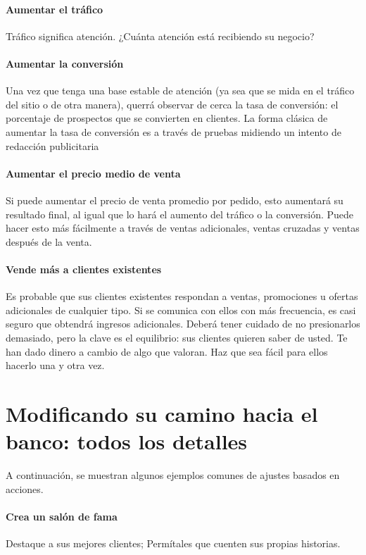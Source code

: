 \documentclass[10pt]{book}
\begin{document}
	    \paragraph{Aumentar el tráfico}
		Tráfico significa atención. ¿Cuánta atención está recibiendo su negocio?

	    \paragraph{Aumentar la conversión}
		Una vez que tenga una base estable de atención (ya sea que se mida en el tráfico del sitio o de otra manera), querrá observar de cerca la tasa de conversión: el porcentaje de prospectos que se convierten en clientes. La forma clásica de aumentar la tasa de conversión es a través de pruebas midiendo un intento de redacción publicitaria 

	    \paragraph{Aumentar el precio medio de venta}
		Si puede aumentar el precio de venta promedio por pedido, esto aumentará su resultado final, al igual que lo hará el aumento del tráfico o la conversión. Puede hacer esto más fácilmente a través de ventas adicionales, ventas cruzadas y ventas después de la venta. 

	    \paragraph{Vende más a clientes existentes}
		Es probable que sus clientes existentes respondan a ventas, promociones u ofertas adicionales de cualquier tipo. Si se comunica con ellos con más frecuencia, es casi seguro que obtendrá ingresos adicionales. Deberá tener cuidado de no presionarlos demasiado, pero la clave es el equilibrio: sus clientes quieren saber de usted. Te han dado dinero a cambio de algo que valoran. Haz que sea fácil para ellos hacerlo una y otra vez.

	\section{Modificando su camino hacia el banco: todos los detalles}
		A continuación, se muestran algunos ejemplos comunes de ajustes basados en acciones.

	    \paragraph{Crea un salón de fama}
		Destaque a sus mejores clientes; Permítales que cuenten sus propias historias.
\end{document}
